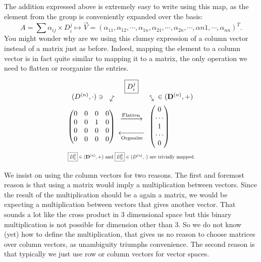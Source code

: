 \documentclass[10pt,a4paper]{article}
\newcommand{\DD}[2]{\boxed{D_{#1}^{#2}}}
\begin{document}
	The addition expressed above is extremely easy to write using this map, as the element from the group is conveniently expanded over the basis:
	\begin{equation}
	A = \sum \alpha_{ij} \times \DD ij \mapsto \vec V = (\alpha_{11}, \alpha_{12}, \cdots, \alpha_{1n},\alpha_{21},\cdots, \alpha_{2n}, \cdots,\alpha{n1},\cdots,\alpha_{nn} )^T.
	\end{equation}
	You might wonder why are we using this clumsy expression of a column vector instead of a matrix just as before. Indeed, mapping the element to a column vector is in fact quite similar to mapping it to a matrix, the only operation we need to flatten or reorganize the entries. 
	\begin{equation}
	\begin{matrix}
		\begin{tikzpicture}
		\node (0,0) {$\DD ij$};
		\node[rotate=-60] at (1,-0.6)  {$\mapsto$};
		\node at (2.2,-0.5)  {$\in (\mathbf D^{(n)},+)$};
		\node at (1.4,-2)  {$\begin{pmatrix}
			0 \\\cdots \\1\\\cdots \\ 0
			\end{pmatrix}$};
		
		\node[rotate=240] at (-1,-0.6)  {$\mapsto$};
		\node at (-2.2,-0.5) {$(D^{(n)},\cdot )\ni$};
		\node at (-2,-2)  {$\begin{pmatrix}
			0&0 & 0&0  \\
			0&0 &1&0  \\
			0&0 &0 & 0 \\
			0&0 &0 & 0 
			\end{pmatrix}$};
		
		\node at (0,-1.5) {$\xrightarrow{\text{Flatten}}$};
		\node at (0,-2.5) {$\xleftarrow[\text{Organize}]{}$};
		\node[scale=0.7] at (0,-3.5) {$\DD 00 \in (\mathbf D^{(n)},+) $ and $\DD 00 \in (D^{(n)},\cdot )$ are trivially mapped.};
		\end{tikzpicture}	
	\end{matrix}
	\end{equation}
	We insist on using the column vectors for two reasons. The first and foremost reason is that using a matrix would imply a multiplication between vectors. Since the result of the multiplication should be a again a matrix, we would be expecting a multiplication between vectors that gives another vector. That sounds a lot like the cross product in $3$ dimensional space but this binary multiplication is not possible for dimension other than $3$. So we do not know (yet) how to define the multiplication, that gives us no reason to choose matrices over column vectors, as unambiguity triumphs convenience. The second reason is that typically we just use row or column vectors for vector spaces.
	
\end{document}
